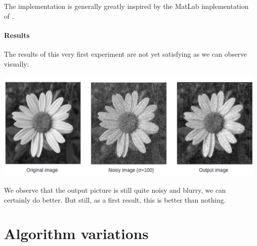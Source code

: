The implementation is generally greatly inspired by the MatLab implementation of \cite{glide_2014}.

\paragraph{Results}
The results of this very first experiment are not yet satisfying as we can observe visually:

\includegraphics[width=\textwidth]{img/firstimpl.png}

We observe that the output picture is still quite noisy and blurry, we can certainly do better. But still, as a first result, this is better than nothing.

\section{Algorithm variations}

